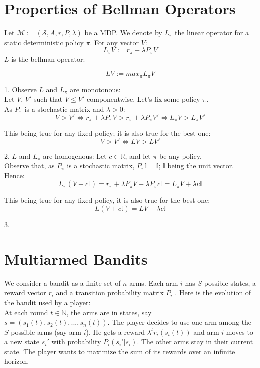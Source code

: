 \documentclass[12pt]{article}
\begin{document}
    
\section{Properties of Bellman Operators}

Let $\mathcal{M} := (\mathcal{S}, A, r, P, \lambda)$ be a MDP. 
We denote by $L_{\pi}$ the linear operator for a static deterministic policy $\pi$. For any vector $V$:
$$ L_{\pi} V := r_{\pi} + \lambda P_{\pi} V$$
$L$ is the bellman operator:

$$ LV := max_{\pi} L_{\pi} V$$

1. Observe $L$ and $L_{\pi}$ are monotonous: \\
Let $V$, $V'$ such that $V \le V'$ componentwise. Let's fix some policy $\pi$.\\As $P_{\pi}$ is a stochastic matrix and $\lambda > 0$:
$$V > V' \Leftrightarrow r_{\pi} +\lambda P_{\pi} V > r_{\pi} + \lambda P_{\pi} V'  \Leftrightarrow L_{\pi} V > L_{\pi}V'$$

This being true for any fixed policy; it is also true for the best one: $$V > V' \Leftrightarrow LV > LV'$$

2. $L$ and $L_{\pi}$ are homogenous:
Let $c \in  \mathbb{R}$, and let $\pi$ be any policy. \\
Observe that, as $P_{\pi}$ is a stochastic matrix, $P_{\pi} \mathbb{I} = \mathbb{I}$; $\mathbb{I}$ being the unit vector. 
Hence: 
$$ L_{\pi} (V + c\mathbb{I}) = r_{\pi} + \lambda P_{\pi} V + \lambda P_{\pi} c \mathbb{I} = L_{\pi} V + \lambda c \mathbb{I} $$

This being true for any fixed policy, it is also true for the best one: $$ L(V + c\mathbb{I}) = LV + \lambda c \mathbb{I} $$ 

3. 

\section{Multiarmed Bandits}

We consider a bandit as a finite set of $n$ arms. Each arm $i$ has $S$ possible states,
a reward vector $r_i$ and a transition probability matrix $P_i$ . Here is the evolution
of the bandit used by a player: \\
At each round $t \in \mathbb{N}$, the arms are in states, say $s = (s_1 (t), s_2 (t), . . . , s_n (t))$. The player decides to use one arm among the $S$ possible arms (say arm $i$). He gets a reward $\lambda^t r_i (s_i(t) )$ and arm $i$ moves to a new state $s_i'$ with probability $P_i (s_i'|s_i )$. The other arms stay in their current state. The
player wants to maximize the sum of its rewards over an infinite horizon. \\
\end{document}
